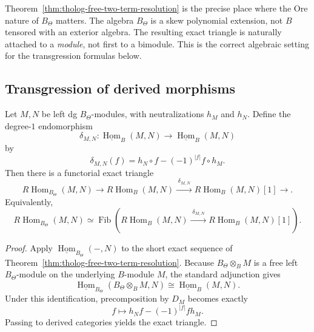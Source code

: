 \begin{remark}
Theorem~\ref{thm:tholog-free-two-term-resolution} is the precise place where the Ore nature of \(B_{\Theta}\) matters.
The algebra \(B_{\Theta}\) is a skew polynomial extension, not \(B\) tensored with an exterior algebra.
The resulting exact triangle is naturally attached to a \emph{module}, not first to a bimodule.
This is the correct algebraic setting for the transgression formulas below.
\end{remark}

\subsection{Transgression of derived morphisms}

\begin{theorem}
Let \(M,N\) be left dg \(B_{\Theta}\)-modules, with neutralizations \(h_{M}\) and \(h_{N}\).
Define the degree-\(1\) endomorphism
\[
\delta_{M,N}:\underline{\operatorname{Hom}}_{B}(M,N)\longrightarrow
\underline{\operatorname{Hom}}_{B}(M,N)
\]
by
\[
\delta_{M,N}(f)=h_{N}\circ f-(-1)^{|f|}f\circ h_{M}.
\]
Then there is a functorial exact triangle
\[
R\!\operatorname{Hom}_{B_{\Theta}}(M,N)
\longrightarrow
R\!\operatorname{Hom}_{B}(M,N)
\xrightarrow{\;\delta_{M,N}\;}
R\!\operatorname{Hom}_{B}(M,N)[1]
\longrightarrow .
\]
Equivalently,
\[
R\!\operatorname{Hom}_{B_{\Theta}}(M,N)
\simeq
\operatorname{Fib}\!\left(
R\!\operatorname{Hom}_{B}(M,N)
\xrightarrow{\;\delta_{M,N}\;}
R\!\operatorname{Hom}_{B}(M,N)[1]
\right).
\]
\end{theorem}

\begin{proof}
Apply \(\underline{\operatorname{Hom}}_{B_{\Theta}}(-,N)\) to the short exact sequence of Theorem~\ref{thm:tholog-free-two-term-resolution}.
Because \(B_{\Theta}\otimes_{B}M\) is a free left \(B_{\Theta}\)-module on the underlying \(B\)-module \(M\), the standard adjunction gives
\[
\underline{\operatorname{Hom}}_{B_{\Theta}}(B_{\Theta}\otimes_{B}M,N)
\cong
\underline{\operatorname{Hom}}_{B}(M,N).
\]
Under this identification, precomposition by \(D_{M}\) becomes exactly
\[
f\longmapsto h_{N}f-(-1)^{|f|}fh_{M}.
\]
Passing to derived categories yields the exact triangle.
\end{proof}

